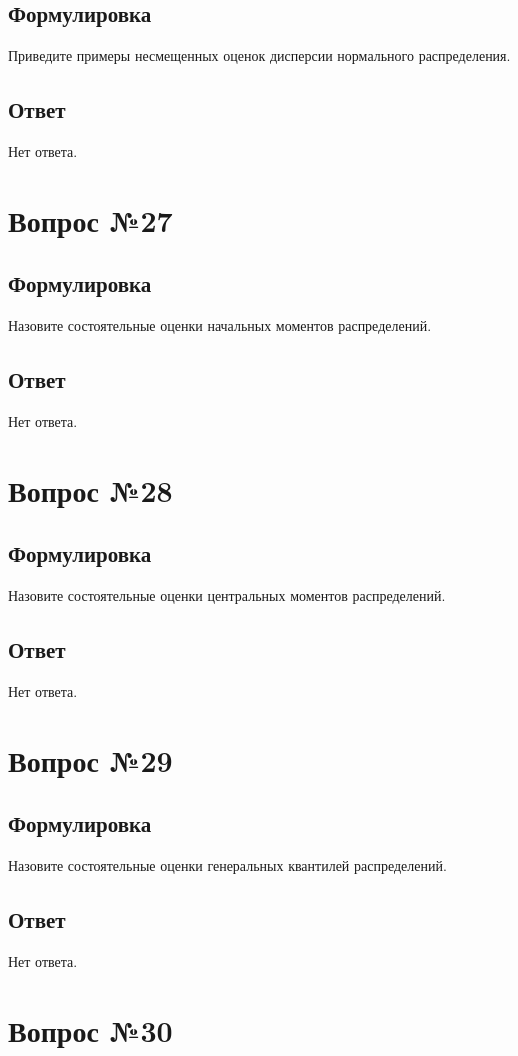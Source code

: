 \documentclass[a4]{article}
\begin{document}
	\subsection*{Формулировка}
	Приведите примеры несмещенных оценок дисперсии нормального распределения.
	\subsection*{Ответ}
	Нет ответа.
	
	\section{Вопрос №27}
	\subsection*{Формулировка}
	Назовите состоятельные оценки начальных моментов распределений.
	\subsection*{Ответ}
	Нет ответа.
	
	\section{Вопрос №28}
	\subsection*{Формулировка}
	Назовите состоятельные оценки центральных моментов распределений.
	\subsection*{Ответ}
	Нет ответа.
	
	\section{Вопрос №29}
	\subsection*{Формулировка}
	Назовите состоятельные оценки генеральных квантилей распределений.
	\subsection*{Ответ}
	Нет ответа.
	
	\section{Вопрос №30}
\end{document}
